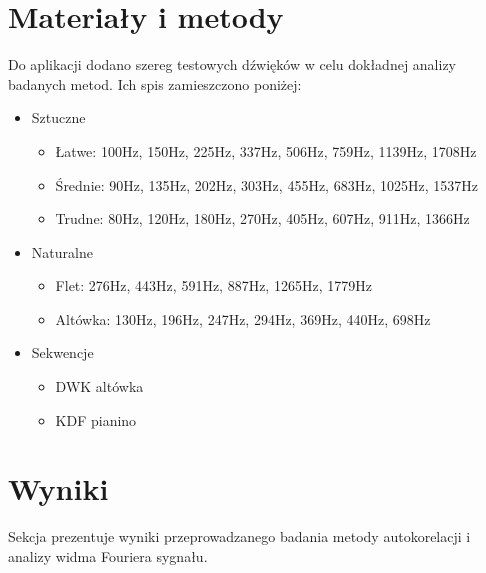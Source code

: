 \documentclass{classrep}
\begin{document}
\section{Materiały i metody}
Do aplikacji dodano szereg testowych dźwięków w celu dokładnej analizy badanych metod. Ich spis zamieszczono poniżej:\\
\indent
\begin{itemize}
\item Sztuczne
\begin{itemize}
\item Łatwe: 100Hz, 150Hz, 225Hz, 337Hz, 506Hz, 759Hz, 1139Hz, 1708Hz
\item Średnie: 90Hz, 135Hz, 202Hz, 303Hz, 455Hz, 683Hz, 1025Hz, 1537Hz
\item Trudne: 80Hz, 120Hz, 180Hz, 270Hz, 405Hz, 607Hz, 911Hz, 1366Hz
\end{itemize}
\item Naturalne
\begin{itemize}
\item Flet: 276Hz, 443Hz, 591Hz, 887Hz, 1265Hz, 1779Hz
\item Altówka: 130Hz, 196Hz, 247Hz, 294Hz, 369Hz, 440Hz, 698Hz
\end{itemize}
\item Sekwencje
\begin{itemize}
\item DWK altówka
\item KDF pianino
\end{itemize}
\end{itemize}

\section{Wyniki}
Sekcja prezentuje wyniki przeprowadzanego badania metody autokorelacji i analizy widma Fouriera sygnału. 
\end{document}
